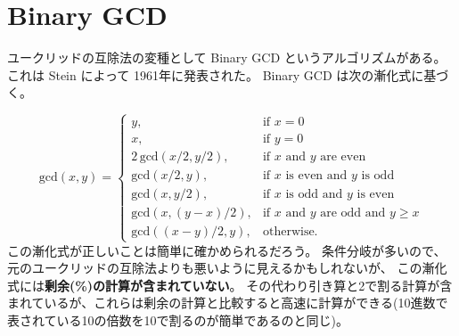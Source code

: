 \documentclass[a4paper,oneside,onecolumn,openany,article,10pt]{memoir}
\theoremstyle{remark}
\begin{document}
\section{Binary GCD}
ユークリッドの互除法の変種として Binary GCD というアルゴリズムがある。
これは Stein によって 1961年に発表された。
Binary GCD は次の漸化式に基づく。

\begin{equation}
\mathrm{gcd}(x, y) =
\begin{cases}
y,& \text{if } x = 0\\
x,& \text{if } y = 0\\
2\,\mathrm{gcd}(x/2, y/2),& \text{if $x$ and $y$ are even}\\
\mathrm{gcd}(x/2, y),& \text{if $x$ is even and $y$ is odd}\\
\mathrm{gcd}(x, y/2),& \text{if $x$ is odd and $y$ is even}\\
\mathrm{gcd}(x, (y-x)/2),& \text{if $x$ and $y$ are odd and $y \ge x$}\\
\mathrm{gcd}((x-y)/2, y),& \text{otherwise.}
\end{cases}
\label{eq:bgcd}
\end{equation}
この漸化式が正しいことは簡単に確かめられるだろう。
条件分岐が多いので、元のユークリッドの互除法よりも悪いように見えるかもしれないが、
この漸化式には\textbf{剰余(\%)の計算が含まれていない}。
その代わり引き算と2で割る計算が含まれているが、これらは剰余の計算と比較すると高速に計算ができる(10進数で表されている10の倍数を10で割るのが簡単であるのと同じ)。
\end{document}

